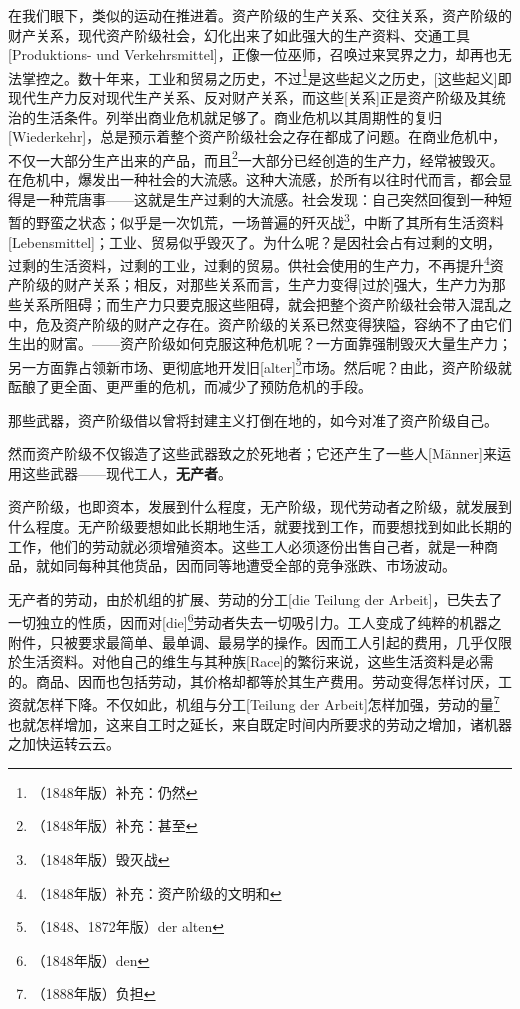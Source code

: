 \documentclass[a4paper,12pt]{ctexart}
\begin{document}
在我们眼下，类似的运动在推进着。资产阶级的生产关系、交往关系，资产阶级的财产关系，现代资产阶级社会，幻化出来了如此强大的生产资料、交通工具[Produktions- und Verkehrsmittel]，正像一位巫师，召唤过来冥界之力，却再也无法掌控之。数十年来，工业和贸易之历史，不过\footnote{（1848年版）补充：仍然}是这些起义之历史，[这些起义]即现代生产力反对现代生产关系、反对财产关系，而这些[关系]正是资产阶级及其统治的生活条件。列举出商业危机就足够了。商业危机以其周期性的复归[Wiederkehr]，总是预示着整个资产阶级社会之存在都成了问题。在商业危机中，不仅一大部分生产出来的产品，而且\footnote{（1848年版）补充：甚至}一大部分已经创造的生产力，经常被毁灭。在危机中，爆发出一种社会的大流感。这种大流感，於所有以往时代而言，都会显得是一种荒唐事——这就是生产过剩的大流感。社会发现：自己突然回復到一种短暂的野蛮之状态；似乎是一次饥荒，一场普遍的歼灭战\footnote{（1848年版）毁灭战}，中断了其所有生活资料[Lebensmittel]；工业、贸易似乎毁灭了。为什么呢？是因社会占有过剩的文明，过剩的生活资料，过剩的工业，过剩的贸易。供社会使用的生产力，不再提升\footnote{（1848年版）补充：资产阶级的文明和}资产阶级的财产关系；相反，对那些关系而言，生产力变得[过於]强大，生产力为那些关系所阻碍；而生产力只要克服这些阻碍，就会把整个资产阶级社会带入混乱之中，危及资产阶级的财产之存在。资产阶级的关系已然变得狭隘，容纳不了由它们生出的财富。——资产阶级如何克服这种危机呢？一方面靠强制毁灭大量生产力；另一方面靠占领新市场、更彻底地开发旧[alter]\footnote{（1848、1872年版）der alten}市场。然后呢？由此，资产阶级就酝酿了更全面、更严重的危机，而减少了预防危机的手段。

那些武器，资产阶级借以曾将封建主义打倒在地的，如今对准了资产阶级自己。

然而资产阶级不仅锻造了这些武器致之於死地者；它还产生了一些人[Männer]来运用这些武器——现代工人，\textbf{无产者}。

资产阶级，也即资本，发展到什么程度，无产阶级，现代劳动者之阶级，就发展到什么程度。无产阶级要想如此长期地生活，就要找到工作，而要想找到如此长期的工作，他们的劳动就必须增殖资本。这些工人必须逐份出售自己者，就是一种商品，就如同每种其他货品，因而同等地遭受全部的竞争涨跌、市场波动。

无产者的劳动，由於机组的扩展、劳动的分工[die Teilung der Arbeit]，已失去了一切独立的性质，因而对[die]\footnote{（1848年版）den}劳动者失去一切吸引力。工人变成了纯粹的机器之附件，只被要求最简单、最单调、最易学的操作。因而工人引起的费用，几乎仅限於生活资料。对他自己的维生与其种族[Race]的繁衍来说，这些生活资料是必需的。商品、因而也包括劳动，其价格却都等於其生产费用。劳动变得怎样讨厌，工资就怎样下降。不仅如此，机组与分工[Teilung der Arbeit]怎样加强，劳动的量\footnote{（1888年版）负担}也就怎样增加，这来自工时之延长，来自既定时间内所要求的劳动之增加，诸机器之加快运转云云。
\end{document}
